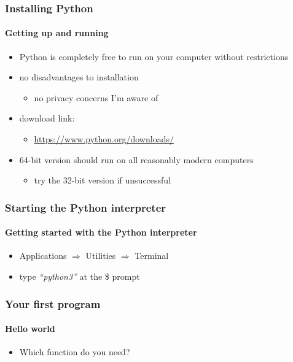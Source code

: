 \documentclass{beamer}
\begin{document}
    \begin{frame}
	    \frametitle{Installing Python}
	    \framesubtitle{Getting up and running}

	    \begin{itemize}
		    \item Python is completely free to run on your computer without restrictions
		    \item no disadvantages to installation
			    \begin{itemize}
				    \item no privacy concerns I'm aware of
			    \end{itemize}
		    \item download link:
			    \begin{itemize}
				    \item \url{https://www.python.org/downloads/}
			    \end{itemize}
		    \item 64-bit version should run on all reasonably modern computers
			    \begin{itemize}
		    \item try the 32-bit version if unsuccessful
			    \end{itemize}
	    \end{itemize}
    \end{frame}

    
    \begin{frame}
	    \frametitle{Starting the Python interpreter}
	    \framesubtitle{Getting started with the Python interpreter}

	    \begin{itemize}
		    \item Applications $\Rightarrow$ Utilities $\Rightarrow$ Terminal
		    \item type \textit{``python3''} at the \$ prompt
	    \end{itemize}
    \end{frame}




    \begin{frame}
	    \frametitle{Your first program}
	    \framesubtitle{Hello world}

	    \begin{itemize}
		    \item Which function do you need?
	    \end{itemize}
	    \lstA
    \end{frame}
\end{document}
